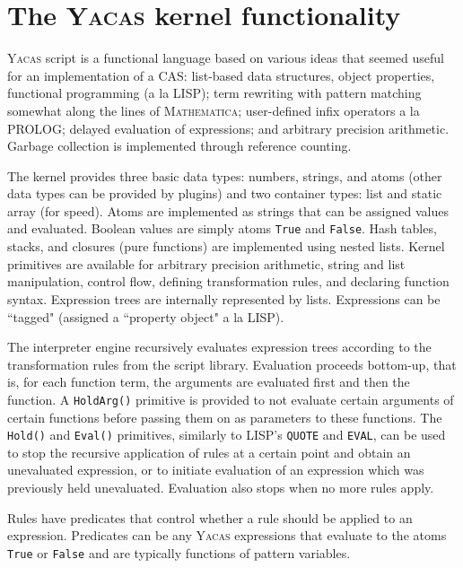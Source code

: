 \documentclass{llncs}
\begin{document}
%

\section{The \textsc{Yacas} kernel functionality}

\textsc{Yacas} script is a functional language based on various ideas that
seemed useful for an implementation of a CAS: list-based data structures,
object properties, functional programming (a la LISP); term rewriting
\cite{BN98} with pattern matching somewhat along the lines of
\textsc{Mathematica}; user-defined infix operators a la PROLOG; delayed
evaluation of expressions; and arbitrary precision arithmetic. Garbage
collection is implemented through reference counting.


The kernel provides three basic data types: numbers, strings, and atoms (other data types
can be provided by plugins) and
two container types: list and static array (for speed). Atoms are implemented
as strings that can be assigned values and evaluated. Boolean values are simply
atoms \texttt{True} and \texttt{False}. Hash tables, stacks, and
closures (pure functions) are implemented using nested lists. Kernel primitives are available for arbitrary
precision arithmetic, string and list manipulation, control flow, defining
transformation rules, and declaring function  syntax. Expression trees are
internally represented by lists. Expressions can be ``tagged" (assigned a
``property object" a la LISP).

The interpreter engine recursively evaluates expression trees according to
the transformation rules from the script library.
Evaluation proceeds bottom-up, that is, for each function term, the arguments are evaluated first and then the function.
A \texttt{HoldArg()} primitive is provided to not evaluate certain arguments of
certain functions before passing them on as parameters to these functions. The
\texttt{Hold()} and \texttt{Eval()} primitives, similarly to LISP's \texttt{QUOTE} and \texttt{EVAL}, can
be used to stop the recursive application of rules at a certain point and
obtain an unevaluated expression, or to initiate evaluation of an expression
which was previously held unevaluated. Evaluation also stops when no more rules apply.


Rules have predicates that control whether a
rule should be applied to an expression. Predicates can be any \textsc{Yacas}
expressions that evaluate to the atoms \texttt{True} or \texttt{False} and are typically
functions of pattern variables.
\end{document}
